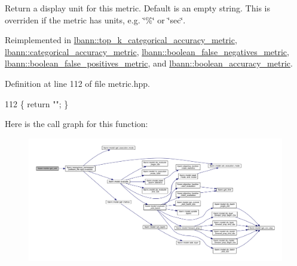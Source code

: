 Return a display unit for this metric. Default is an empty string. This is overriden if the metric has units, e.\+g. \char`\"{}\%\char`\"{} or \char`\"{}sec\char`\"{}. 

Reimplemented in \hyperlink{classlbann_1_1top__k__categorical__accuracy__metric_a0531d4f199fa61ce448af8c945ff3dfc}{lbann\+::top\+\_\+k\+\_\+categorical\+\_\+accuracy\+\_\+metric}, \hyperlink{classlbann_1_1categorical__accuracy__metric_a9c06851bc233a01b28c346a10d278d99}{lbann\+::categorical\+\_\+accuracy\+\_\+metric}, \hyperlink{classlbann_1_1boolean__false__negatives__metric_abe2bdb0c15ff481caa234e13fe7df2b9}{lbann\+::boolean\+\_\+false\+\_\+negatives\+\_\+metric}, \hyperlink{classlbann_1_1boolean__false__positives__metric_ab42b53134f128d26e3df37ca7a3d4cea}{lbann\+::boolean\+\_\+false\+\_\+positives\+\_\+metric}, and \hyperlink{classlbann_1_1boolean__accuracy__metric_abde43253ef54b243f9faa1b1adea0672}{lbann\+::boolean\+\_\+accuracy\+\_\+metric}.



Definition at line 112 of file metric.\+hpp.


\begin{DoxyCode}
112 \{ \textcolor{keywordflow}{return} \textcolor{stringliteral}{""}; \}
\end{DoxyCode}
Here is the call graph for this function\+:\nopagebreak
\begin{figure}[H]
\begin{center}
\leavevmode
\includegraphics[width=350pt]{classlbann_1_1metric_a13fd302dec85190b877f7146529e516c_cgraph}
\end{center}
\end{figure}
\mbox{\label{classlbann_1_1metric_ab3d1ec8247352467790be036a07cfc2b}} 
